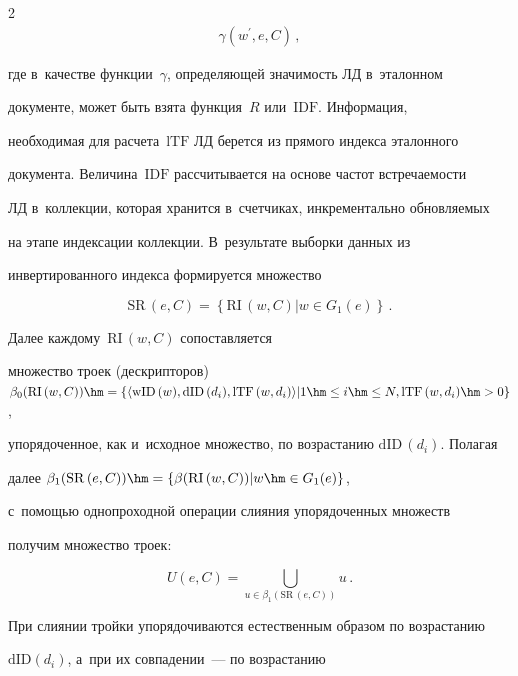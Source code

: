 \begin{multicols}{2}
\begin{multline*}
\gamma\left(w^\prime,e, C\right)\,,

  \end{multline*}

где в~качестве функции~$\gamma$, определяющей значимость ЛД в~эталонном 

документе, может быть взята функция~$R$ или~$\mathrm{IDF}$. Информация, 

необходимая для расчета~$\mathrm{lTF}$ ЛД берется из прямого индекса эталонного 

документа. Величина~$\mathrm{IDF}$ рассчитывается на основе частот встречаемости 

ЛД в~коллекции, которая хранится в~счетчиках, инкрементально обновляемых 

на этапе индексации коллекции. В~результате выборки данных из 

инвертированного индекса формируется множество 

$$

\mathrm{SR}\,(e,C)= 

\left\{\mathrm{RI}\,(w,C)\vert w\in G_1(e)\right\}\,.

$$



 Далее каждому~$\mathrm{RI}\,(w,C)$ сопоставляется 

множество троек (дескрипторов) $\beta_0(\mathrm{RI}\,(w,C))\hm= \{\langle 

\mathrm{wID}\,(w), \mathrm{dID}\,(d_i), \mathrm{lTF}\,(w,d_i)\rangle \vert 

1\hm\leq i\hm\leq N,\linebreak \mathrm{lTF}\,(w,d_i)\hm>0\}$, 

упорядоченное, как и~исходное множество, по возрастанию $\mathrm{dID}\,(d_i)$. Полагая 

далее $\beta_1(\mathrm{SR}\,(e,C))\hm= \{\beta(\mathrm{RI}\,(w,C))\vert w\hm\in 

G_1(e)\}$,  

с~по\-мощью однопроходной операции слияния упорядоченных множеств 

получим множество троек:

$$

U(e,C)= \mathop{\bigcup}\limits_{u\in \beta_1(\mathrm{SR}\,(e,C))} u\,.

$$ 

При слиянии тройки упорядочиваются естественным образом по воз\-рас\-та\-нию 

$\mathrm{dID}\left(d_i\right)$, а~при их совпадении~--- по воз\-рас\-та\-нию 


\end{multicols}
